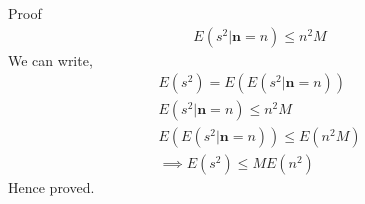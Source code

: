\documentclass{beamer}
\begin{document}
\begin{frame}{Proof}
\begin{align}
    E(s^2|\textbf{n} = n) \leq n^2M
\end{align}
We can write,
\begin{align}
    E(s^2) = E(E(s^2|\textbf{n} = n))\\
    E(s^2|\textbf{n} = n) \leq n^2M\\
    E(E(s^2|\textbf{n} = n)) \leq E(n^2M)\\
    \implies E(s^2) \leq ME(n^2)
\end{align}
Hence proved.
\end{frame}
\end{document}
